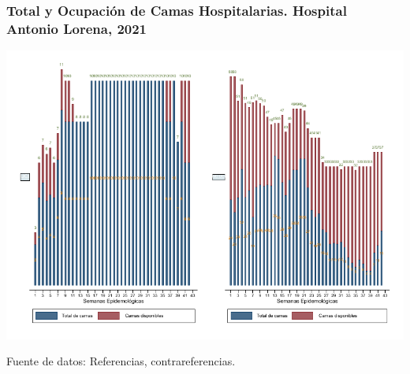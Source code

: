 \documentclass[xcolor=table]{beamer}
\begin{document}
	\begin{frame}
		\frametitle{Total y Ocupación de Camas Hospitalarias. Hospital Antonio Lorena, 2021}
		\vspace{-.2cm}
		\begin{center}
			\includegraphics[width=0.9\linewidth, trim={0cm .5cm 0cm 0.2cm},clip]{../figuras/h_lorena}
			
			\begin{table}[]
			\end{table}
			
		\end{center}
		{\tiny Fuente de datos: Referencias, contrareferencias.}
	\end{frame}
	
\end{document}
